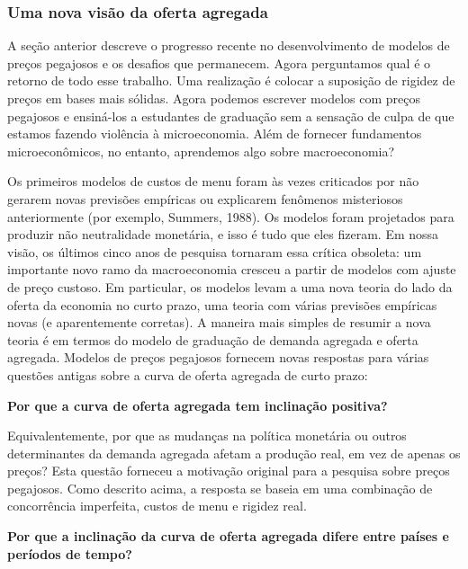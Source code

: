 \documentclass[12pt]{article}
\begin{document}
\subsubsection{\textbf{Uma nova visão da oferta agregada}}

A seção anterior descreve o progresso recente no desenvolvimento de modelos de preços pegajosos e os desafios que permanecem. Agora perguntamos qual é o retorno de todo esse trabalho. Uma realização é colocar a suposição de rigidez de preços em bases mais sólidas. Agora podemos escrever modelos com preços pegajosos e ensiná-los a estudantes de graduação sem a sensação de culpa de que estamos fazendo violência à microeconomia. Além de fornecer fundamentos microeconômicos, no entanto, aprendemos algo sobre macroeconomia?

Os primeiros modelos de custos de menu foram às vezes criticados por não gerarem novas previsões empíricas ou explicarem fenômenos misteriosos anteriormente (por exemplo, Summers, 1988). Os modelos foram projetados para produzir não neutralidade monetária, e isso é tudo que eles fizeram. Em nossa visão, os últimos cinco anos de pesquisa tornaram essa crítica obsoleta: um importante novo ramo da macroeconomia cresceu a partir de modelos com ajuste de preço custoso. Em particular, os modelos levam a uma nova teoria do lado da oferta da economia no curto prazo, uma teoria com várias previsões empíricas novas (e aparentemente corretas). A maneira mais simples de resumir a nova teoria é em termos do modelo de graduação de demanda agregada e oferta agregada. Modelos de preços pegajosos fornecem novas respostas para várias questões antigas sobre a curva de oferta agregada de curto prazo:

\textbf{Por que a curva de oferta agregada tem inclinação positiva?}

Equivalentemente, por que as mudanças na política monetária ou outros determinantes da demanda agregada afetam a produção real, em vez de apenas os preços? Esta questão forneceu a motivação original para a pesquisa sobre preços pegajosos. Como descrito acima, a resposta se baseia em uma combinação de concorrência imperfeita, custos de menu e rigidez real.

\textbf{Por que a inclinação da curva de oferta agregada difere entre países e períodos de tempo?}
\end{document}
